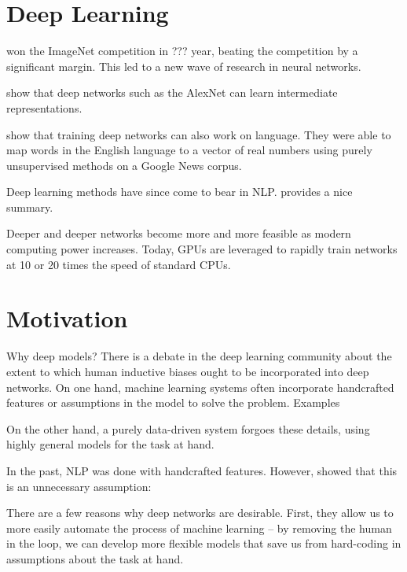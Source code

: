 \documentclass[11pt]{report}
\begin{document}
\section{Deep Learning}


\citet{Krizhevsky2012} won the ImageNet competition in ??? year, beating the competition by a significant margin. This led to a new wave of research in neural networks.

\citet{Zeiler2014} show that deep networks such as the AlexNet can learn intermediate representations.


\citet{mikolov2013word2vec} show that training deep networks can also work on language. They were able to map words in the English language to a vector of real numbers using purely unsupervised methods on a Google News corpus. %

Deep learning methods have since come to bear in NLP. \cite{goldberg2015primer} provides a nice summary. %

Deeper and deeper networks become more and more feasible as modern computing power increases. Today, GPUs are leveraged to rapidly train networks at 10 or 20 times the speed of standard CPUs.  %


\section{Motivation}


Why deep models? There is a debate in the deep learning community about the extent to which human inductive biases ought to be incorporated into deep networks. On one hand, machine learning systems often incorporate handcrafted features or assumptions in the model to solve the problem. Examples %

On the other hand, a purely data-driven system forgoes these details, using highly general models for the task at hand.

In the past, NLP was done with handcrafted features. However, \cite{Collobert2011} showed that this is an unnecessary assumption: %


There are a few reasons why deep networks are desirable. First, they allow us to more easily automate the process of machine learning -- by removing the human in the loop, we can develop more flexible models that save us from hard-coding in assumptions about the task at hand. %
\end{document}
